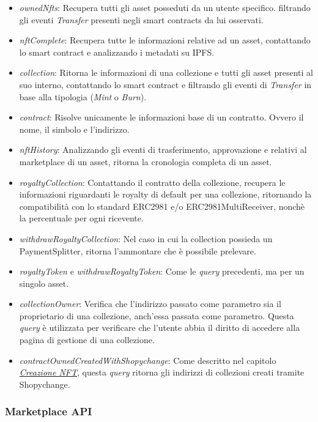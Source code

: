 \begin{itemize}
    \item \textit{ownedNfts}: Recupera tutti gli asset posseduti da un utente specifico. filtrando gli eventi \textit{Transfer} presenti negli smart contracts da lui osservati.
    \item \textit{nftComplete}: Recupera tutte le informazioni relative ad un asset, contattando lo smart contract e analizzando i metadati su IPFS.
    \item \textit{collection}: Ritorna le informazioni di una collezione e tutti gli asset presenti al suo interno, contattando lo smart contract e filtrando gli eventi di \textit{Transfer} in base alla tipologia (\textit{Mint} o \textit{Burn}).
    \item \textit{contract}: Risolve unicamente le informazioni base di un contratto. Ovvero il nome, il simbolo e l'indirizzo.
    \item \textit{nftHistory}: Analizzando gli eventi di trasferimento, approvazione e relativi al marketplace di un asset, ritorna la cronologia completa di un asset.
    \item \textit{royaltyCollection}: Contattando il contratto della collezione, recupera le informazioni riguardanti le royalty di default per una collezione, ritornando la compatibilità con lo standard ERC2981 e/o ERC2981MultiReceiver, nonchè la percentuale per ogni ricevente.
    \item \textit{withdrawRoyaltyCollection}: Nel caso in cui la collection possieda un PaymentSplitter, ritorna l'ammontare che è possibile prelevare.
    \item \textit{royaltyToken} e \textit{withdrawRoyaltyToken}: Come le \textit{query} precedenti, ma per un singolo asset.
    \item \textit{collectionOwner}: Verifica che l'indirizzo passato come parametro sia il proprietario di una collezione, anch'essa passata come parametro. Questa \textit{query} è utilizzata per verificare che l'utente abbia il diritto di accedere alla pagina di gestione di una collezione.
    \item \textit{contractOwnedCreatedWithShopychange}: Come descritto nel capitolo \hyperref[sec:creazioneNFT]{\textit{Creazione NFT}}, questa \textit{query} ritorna gli indirizzi di collezioni creati tramite Shopychange.
\end{itemize}

\subsubsection{Marketplace API}

